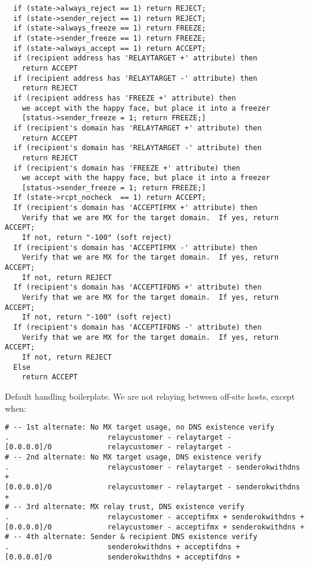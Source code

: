 \begin{tscreen}
\begin{verbatim}
  if (state->always_reject == 1) return REJECT;
  if (state->sender_reject == 1) return REJECT;
  if (state->always_freeze == 1) return FREEZE;
  if (state->sender_freeze == 1) return FREEZE;
  if (state->always_accept == 1) return ACCEPT;
  if (recipient address has 'RELAYTARGET +' attribute) then
    return ACCEPT
  if (recipient address has 'RELAYTARGET -' attribute) then
    return REJECT
  if (recipient address has 'FREEZE +' attribute) then
    we accept with the happy face, but place it into a freezer
    [status->sender_freeze = 1; return FREEZE;]
  if (recipient's domain has 'RELAYTARGET +' attribute) then
    return ACCEPT
  if (recipient's domain has 'RELAYTARGET -' attribute) then
    return REJECT
  if (recipient's domain has 'FREEZE +' attribute) then
    we accept with the happy face, but place it into a freezer
    [status->sender_freeze = 1; return FREEZE;]
  If (state->rcpt_nocheck  == 1) return ACCEPT;
  If (recipient's domain has 'ACCEPTIFMX +' attribute) then
    Verify that we are MX for the target domain.  If yes, return ACCEPT;
    If not, return "-100" (soft reject)
  If (recipient's domain has 'ACCEPTIFMX -' attribute) then
    Verify that we are MX for the target domain.  If yes, return ACCEPT;
    If not, return REJECT
  If (recipient's domain has 'ACCEPTIFDNS +' attribute) then
    Verify that we are MX for the target domain.  If yes, return ACCEPT;
    If not, return "-100" (soft reject)
  If (recipient's domain has 'ACCEPTIFDNS -' attribute) then
    Verify that we are MX for the target domain.  If yes, return ACCEPT;
    If not, return REJECT
  Else
    return ACCEPT
\end{verbatim}
\end{tscreen}


Default handling boilerplate. We are not relaying between off-site hosts, 
except when:

\begin{tscreen}
\begin{verbatim}
# -- 1st alternate: No MX target usage, no DNS existence verify
.                       relaycustomer - relaytarget -
[0.0.0.0]/0             relaycustomer - relaytarget -
# -- 2nd alternate: No MX target usage, DNS existence verify
.                       relaycustomer - relaytarget - senderokwithdns +
[0.0.0.0]/0             relaycustomer - relaytarget - senderokwithdns +
# -- 3rd alternate: MX relay trust, DNS existence verify
.                       relaycustomer - acceptifmx + senderokwithdns +
[0.0.0.0]/0             relaycustomer - acceptifmx + senderokwithdns +
# -- 4th alternate: Sender & recipient DNS existence verify
.                       senderokwithdns + acceptifdns +
[0.0.0.0]/0             senderokwithdns + acceptifdns +
\end{verbatim}
\end{tscreen}


